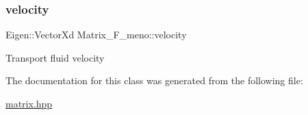 \subsubsection{\texorpdfstring{velocity}{velocity}}
{\footnotesize\ttfamily Eigen\+::\+Vector\+Xd Matrix\+\_\+\+F\+\_\+meno\+::velocity\hspace{0.3cm}{\ttfamily [private]}}

Transport fluid velocity 

The documentation for this class was generated from the following file\+:\begin{DoxyCompactItemize}
\item 
\hyperlink{matrix_8hpp}{matrix.\+hpp}\end{DoxyCompactItemize}
